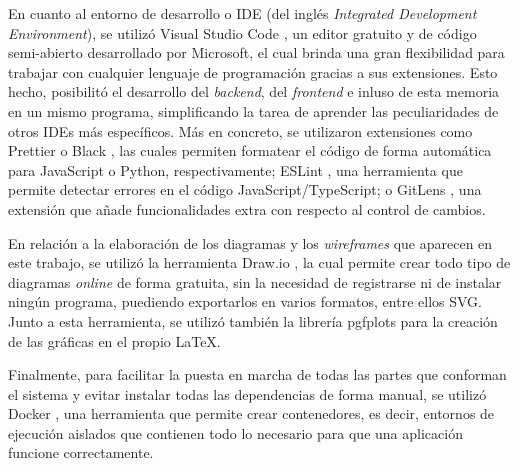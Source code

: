 \bigskip
En cuanto al entorno de desarrollo o IDE (del inglés \textit{Integrated Development Environment}), se utilizó Visual Studio Code \cite{vscode}, un editor gratuito y de código semi-abierto desarrollado por Microsoft, el cual
brinda una gran flexibilidad para trabajar con cualquier lenguaje de programación gracias a sus extensiones. Esto hecho, posibilitó el desarrollo
del \textit{backend}, del \textit{frontend} e inluso de esta memoria en un mismo programa, simplificando la tarea de aprender las peculiaridades de
otros IDEs más específicos. Más en concreto, se utilizaron extensiones como Prettier \cite{prettier} o Black \cite{blackformatter}, las cuales permiten formatear el código de forma automática para JavaScript o Python, respectivamente;
ESLint \cite{eslint}, una herramienta que permite detectar errores en el código JavaScript/TypeScript; o GitLens \cite{gitlens}, una extensión que añade funcionalidades extra con respecto
al control de cambios.

\bigskip
En relación a la elaboración de los diagramas y los \textit{wireframes} que aparecen en este trabajo, se utilizó la herramienta Draw.io \cite{drawio}, la cual permite crear todo tipo de diagramas
\textit{online} de forma gratuita, sin la necesidad de registrarse ni de instalar ningún programa, puediendo exportarlos en varios formatos, entre ellos SVG.
Junto a esta herramienta, se utilizó también la librería pgfplots \cite{pgfplots} para la creación de las gráficas en el propio \LaTeX.

\bigskip
Finalmente, para facilitar la puesta en marcha de todas las partes que conforman el sistema y evitar instalar todas las dependencias de forma manual, se utilizó Docker \cite{docker}, 
una herramienta que permite crear contenedores, es decir, entornos de ejecución aislados que contienen todo lo necesario para que una aplicación funcione correctamente.
